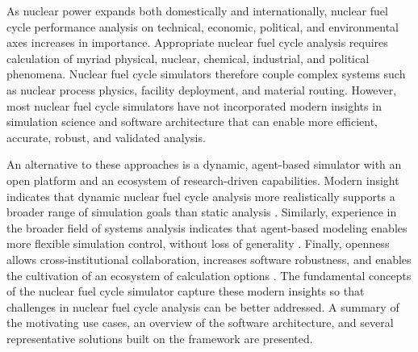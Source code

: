 As nuclear power expands both domestically and internationally, nuclear fuel cycle
performance analysis on technical, economic, political, and environmental axes increases
in importance. Appropriate nuclear fuel cycle analysis requires calculation of myriad physical, nuclear,
chemical, industrial, and political phenomena. Nuclear fuel cycle simulators
therefore couple complex systems such as nuclear process physics,
facility deployment, and material routing. However, most nuclear fuel cycle
simulators have not incorporated modern insights in simulation science and
software architecture that can enable more efficient, accurate, robust, and
validated analysis.

An alternative to these approaches is a dynamic, agent-based simulator with an
open platform and an ecosystem of research-driven capabilities.  Modern
insight indicates that dynamic nuclear fuel cycle analysis more realistically
supports a broader range of simulation goals than static analysis
\cite{piet_dynamic_2011}. Similarly, experience in the broader field of systems
analysis indicates that agent-based modeling enables more flexible simulation
control, without loss of generality \cite{macal_agent-based_2010}. Finally, openness
allows cross-institutional collaboration, increases software robustness, and
enables the cultivation of an ecosystem of calculation options
\cite{softwarecarpentryresource}.  The fundamental concepts of the \Cyclus
nuclear fuel cycle simulator capture these modern insights so that challenges
in nuclear fuel cycle analysis can be better addressed. A summary of the
motivating use cases, an overview of the software architecture, and several
representative solutions built on the framework are presented.


